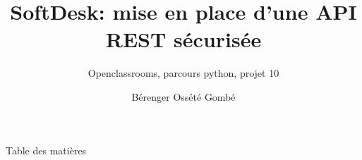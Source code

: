 \documentclass{beamer}
\title{SoftDesk: mise en place d'une API REST sécurisée}
\subtitle{Openclassrooms, parcours python, projet 10}
\author{Bérenger Ossété Gombé}
\begin{document}
\begin{frame}
  \maketitle
\end{frame}

\begin{frame}{Table des matières}
  \tableofcontents
\end{frame}









\end{document}
